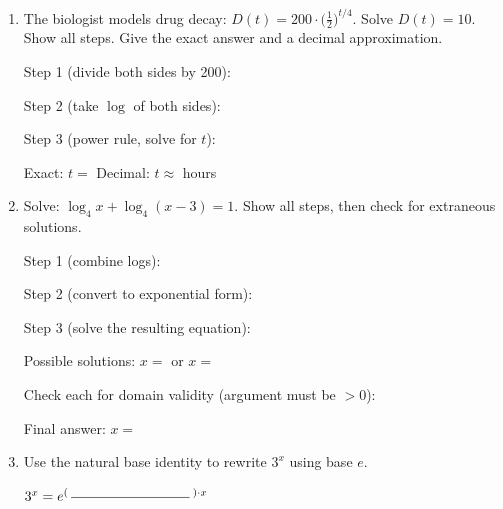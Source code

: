 \documentclass[10pt]{article}
\begin{document}
\vspace{0.08in}

\begin{tcolorbox}[colback=white, colframe=black!40,
    title=\textbf{Tier A --- Approaching Proficiency},
    fonttitle=\bfseries, arc=2mm, left=3mm, right=3mm, top=2mm, bottom=2mm]

\begin{enumerate}[leftmargin=1.8em, itemsep=10pt]

\item The biologist models drug decay: $D(t) = 200\cdot\bigl(\tfrac{1}{2}\bigr)^{t/4}$.
      Solve $D(t) = 10$. Show all steps. Give the exact answer and a decimal approximation.

\vspace{4pt}
Step 1 (divide both sides by 200): \writeline

\vspace{4pt}
Step 2 (take $\log$ of both sides): \writeline

\vspace{4pt}
Step 3 (power rule, solve for $t$): \writeline

\vspace{4pt}
Exact: $t = $ \blank{5cm} \qquad Decimal: $t \approx $ \blank{2.5cm} hours

\item Solve: $\log_4 x + \log_4(x-3) = 1$. Show all steps, then check for extraneous solutions.

\vspace{4pt}
Step 1 (combine logs): \writeline

\vspace{4pt}
Step 2 (convert to exponential form): \writeline

\vspace{4pt}
Step 3 (solve the resulting equation): \writeline

\vspace{4pt}
Possible solutions: $x = $ \blank{2cm} or $x = $ \blank{2cm}

\vspace{4pt}
Check each for domain validity (argument must be $> 0$): 

\vspace{4pt}
Final answer: $x = $ \blank{2.5cm}

\item Use the natural base identity to rewrite $3^x$ using base $e$.

\vspace{4pt}
$3^x = e^{(\;\blank{3cm}\;)\cdot x}$

\end{enumerate}
\end{tcolorbox}
\end{document}
